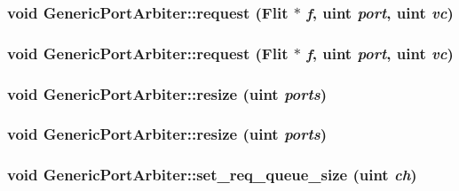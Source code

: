 \hypertarget{classGenericPortArbiter_1480ee32b7d8003479d2404a4b279c56}{
\subsubsection[{request}]{\setlength{\rightskip}{0pt plus 5cm}void GenericPortArbiter::request ({\bf Flit} $\ast$ {\em f}, \/  {\bf uint} {\em port}, \/  {\bf uint} {\em vc})}}
\label{classGenericPortArbiter_1480ee32b7d8003479d2404a4b279c56}


\hypertarget{classGenericPortArbiter_1480ee32b7d8003479d2404a4b279c56}{
\subsubsection[{request}]{\setlength{\rightskip}{0pt plus 5cm}void GenericPortArbiter::request ({\bf Flit} $\ast$ {\em f}, \/  {\bf uint} {\em port}, \/  {\bf uint} {\em vc})}}
\label{classGenericPortArbiter_1480ee32b7d8003479d2404a4b279c56}


\hypertarget{classGenericPortArbiter_3b94b47628229ee3142907005020eb86}{
\subsubsection[{resize}]{\setlength{\rightskip}{0pt plus 5cm}void GenericPortArbiter::resize ({\bf uint} {\em ports})}}
\label{classGenericPortArbiter_3b94b47628229ee3142907005020eb86}


\hypertarget{classGenericPortArbiter_3b94b47628229ee3142907005020eb86}{
\subsubsection[{resize}]{\setlength{\rightskip}{0pt plus 5cm}void GenericPortArbiter::resize ({\bf uint} {\em ports})}}
\label{classGenericPortArbiter_3b94b47628229ee3142907005020eb86}


\hypertarget{classGenericPortArbiter_50daec6e98669e01d74557dfb84b462f}{
\subsubsection[{set\_\-req\_\-queue\_\-size}]{\setlength{\rightskip}{0pt plus 5cm}void GenericPortArbiter::set\_\-req\_\-queue\_\-size ({\bf uint} {\em ch})}}
\label{classGenericPortArbiter_50daec6e98669e01d74557dfb84b462f}


